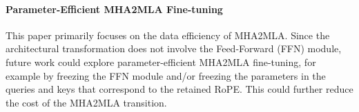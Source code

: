 \paragraph{Parameter-Efficient MHA2MLA Fine-tuning}  
This paper primarily focuses on the data efficiency of MHA2MLA. Since the architectural transformation does not involve the Feed-Forward (FFN) module, future work could explore parameter-efficient MHA2MLA fine-tuning, for example by freezing the FFN module and/or freezing the parameters in the queries and keys that correspond to the retained RoPE. This could further reduce the cost of the MHA2MLA transition.
